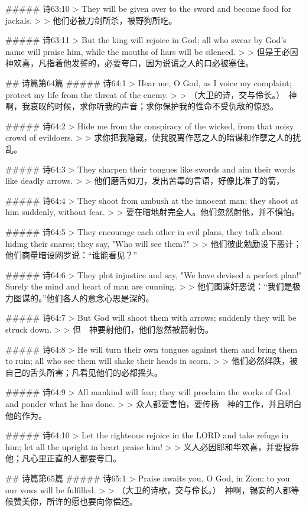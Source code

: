 ##### 诗63:10
> They will be given over to the sword and become food for jackals.
>
> 他们必被刀剑所杀，被野狗所吃。


##### 诗63:11
> But the king will rejoice in God; all who swear by God's name will praise him, while the mouths of liars will be silenced.
>
> 但是王必因　神欢喜，凡指着他发誓的，必要夸口，因为说谎之人的口必被塞住。


## 诗篇第64篇
##### 诗64:1
> Hear me, O God, as I voice my complaint; protect my life from the threat of the enemy.
>
> （大卫的诗，交与伶长。）　神啊，我哀叹的时候，求你听我的声音；求你保护我的性命不受仇敌的惊恐。


##### 诗64:2
> Hide me from the conspiracy of the wicked, from that noisy crowd of evildoers.
>
> 求你把我隐藏，使我脱离作恶之人的暗谋和作孽之人的扰乱。


##### 诗64:3
> They sharpen their tongues like swords and aim their words like deadly arrows.
>
> 他们磨舌如刀，发出苦毒的言语，好像比准了的箭，


##### 诗64:4
> They shoot from ambush at the innocent man; they shoot at him suddenly, without fear.
>
> 要在暗地射完全人。他们忽然射他，并不惧怕。


##### 诗64:5
> They encourage each other in evil plans, they talk about hiding their snares; they say, "Who will see them?"
>
> 他们彼此勉励设下恶计；他们商量暗设网罗说：“谁能看见？”


##### 诗64:6
> They plot injustice and say, "We have devised a perfect plan!" Surely the mind and heart of man are cunning.
>
> 他们图谋奸恶说：“我们是极力图谋的。”他们各人的意念心思是深的。


##### 诗64:7
> But God will shoot them with arrows; suddenly they will be struck down.
>
> 但　神要射他们，他们忽然被箭射伤。


##### 诗64:8
> He will turn their own tongues against them and bring them to ruin; all who see them will shake their heads in scorn.
>
> 他们必然绊跌，被自己的舌头所害；凡看见他们的必都摇头。


##### 诗64:9
> All mankind will fear; they will proclaim the works of God and ponder what he has done.
>
> 众人都要害怕，要传扬　神的工作，并且明白他的作为。


##### 诗64:10
> Let the righteous rejoice in the LORD and take refuge in him; let all the upright in heart praise him!
>
> 义人必因耶和华欢喜，并要投靠他；凡心里正直的人都要夸口。


## 诗篇第65篇
##### 诗65:1
> Praise awaits you, O God, in Zion; to you our vows will be fulfilled.
>
> （大卫的诗歌，交与伶长。）　神啊，锡安的人都等候赞美你，所许的愿也要向你偿还。



